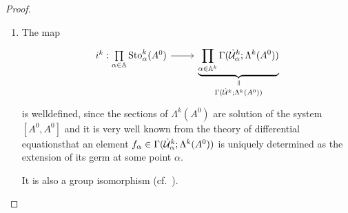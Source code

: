 \begin{proof}
  \begin{enumerate}
    \item The map
      \[ \begin{tikzcd}
        i^k: \underset{\alpha\in\A}\prod\Sto_\alpha^k(A^0)
        \rar &
        \underset{\Gamma(\dot\cU^k;\Lambda^k(A^0))}{%
          \underset{\text{\rotatebox[origin=c]{-90}{$=$}}}{%
            \underbrace{%
              \prod_{\alpha\in\A^k}\Gamma(\dot\cU_\alpha^k;\Lambda^k(A^0))
            }
        }}
      \end{tikzcd} \]
      is welldefined, since the sections of $\Lambda^k(A^0)$ are solution of
      the system $[A^0,A^0]$ and it is very well known from the theory of
      differential equations\TODO[source?] that an element
      $f_\alpha\in\Gamma(\dot{\mathcal{U}}_\alpha^k;\Lambda^k(A^0))$ is uniquely
      determined as the extension of its germ at some point $\alpha$.

      It is also a group isomorphism (cf.~\cite{Loday1994}).

      \begin{comment}
        It is a group isomorphism, since
        \\Problems:
        \begin{itemize}
          \item Show that a element of $\Lambda_\alpha^k(A^0)$ is extensionable
            to the arc $U_\alpha\in\dot\cU_\alpha^k$ if and only if it has
            maximal decay in direction $\alpha$.
          \item \PROBLEM[$\Sto_\alpha^k(A^0)\subsetneq\Lambda_\alpha^k(A^0)$]
            and thus
            \[
              i^k:
              \underset{\alpha\in\A}\prod\Sto_\alpha^k(A^0)
              \subsetneq
              \underset{\alpha\in\A}\prod\Lambda_\alpha^k(A^0)
              \to
              \prod_{\alpha\in\A^k}\Gamma(\dot\cU_\alpha^k;\Lambda^k(A^0))
            \]
        \end{itemize}
        IDEAS:
        \begin{itemize}
          \item Are sections fully determined by there germs at some points?
            \begin{itemize}
              \item since sections are defined by differential equations??


\end{comment}
\end{enumerate}
\end{proof}
